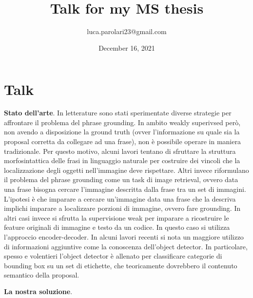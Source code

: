 \documentclass{article}
\title{Talk for my MS thesis}
\author{luca.parolari23@gmail.com}
\date{December 16, 2021}
\begin{document}
\maketitle

\section{Talk}

\textbf{Stato dell'arte}. In letterature sono stati sperimentate
diverse strategie per affrontare il problema del phrase grounding. In
ambito weakly superivsed però, non avendo a disposizione la ground
truth (ovver l'informazione su quale sia la proposal corretta da
collegare ad una frase), non è possibile operare in maniera
tradizionale. Per questo motivo, alcuni lavori tentano di sfruttare la
struttura morfosintattica delle frasi in linguaggio naturale per
costruire dei vincoli che la localizzazione degli oggetti
nell'immagine deve rispettare. Altri invece riformulano il problema
del phrase grounding come un task di image retrieval, ovvero data una
frase bisogna cercare l'immagine descritta dalla frase tra un set di
immagini. L'ipotesi è che imparare a cercare un'immagine data una
frase che la descriva implichi imparare a localizzare porzioni di
immagine, ovvero fare grounding. In altri casi invece si sfrutta la supervisione weak per imparare a ricostruire le feature originali di immagine e testo da un codice. In questo caso si utilizza l'approccio encoder-decoder. In alcuni lavori recenti si nota un maggiore utilizzo di informazioni aggiuntive come la conoscenza dell'object detector. In particolare, spesso e volentieri l'object detector è allenato per classificare categorie di bounding box su un set di etichette, che teoricamente dovrebbero il contenuto semantico della proposal.

\textbf{La nostra soluzione}.
\end{document}
